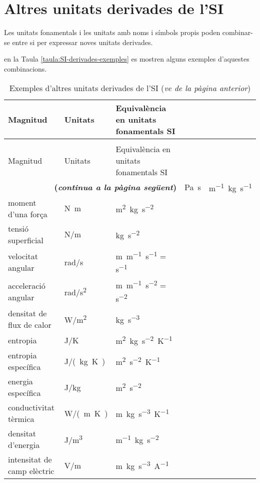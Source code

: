 \section{Altres unitats derivades de l'SI}

Les unitats fonamentals i les unitats amb noms i símbols propis poden combinar-se entre si per expressar noves unitats derivades.

 en la Taula \vref{taula:SI-derivades-exemples} es mostren alguns exemples d'aquestes combinacions.

\begin{longtable}[h]{lll}
   \caption{\label{taula:SI-derivades-exemples} Exemples d'altres unitats derivades de
   l'SI}\\
   \toprule[1pt]
    Magnitud &  Unitats & Equivalència en unitats fonamentals SI\\
   \midrule
   \endfirsthead
   \caption[]{Exemples d'altres unitats derivades de l'SI (\emph{ve de la pàgina
   anterior})}\\
   \toprule[1pt]
    Magnitud &  Unitats & Equivalència en unitats fonamentals SI\\
   \midrule
   \endhead
   \midrule
   \multicolumn{3}{r}{\sffamily\bfseries\color{NavyBlue}(\emph{continua a la pàgina següent})}
   \endfoot
   \endlastfoot
   viscositat dinàmica &  \si{Pa.s}& \si{m^{-1}.kg.s^{-1}} \\
   moment d'una força & \si{N.m} & \si{m^2.kg.s^{-2}} \\
   tensió superficial &  \si{N/m} &   \si{kg.s^{-2}} \\
   velocitat angular & \si{rad/s} & \si{m.m^{-1}.s^{-1}} = \si{s^{-1}} \\
   acceleració angular & \si{rad/s^2} & \si{m.m^{-1}.s^{-2}} = \si{s^{-2}} \\
   densitat de flux de calor & \si{W/m^2} & \si{kg.s^{-3}} \\
   entropia & \si{J/K} & \si{m^2.kg.s^{-2}.K^{-1}} \\
   entropia específica & \si{J/(kg.K)} &\si{m^2.s^{-2}.K^{-1}} \\
   energia específica & \si{J/kg} & \si{m^2.s^{-2}} \\
   conductivitat tèrmica & \si{W/(m.K)} & \si{m.kg.s^{-3}.K^{-1}} \\
   densitat d'energia & \si{J/m^3} & \si{m^{-1}.kg.s^{-2}} \\
   intensitat de camp elèctric & \si{V/m}& \si{m.kg.s^{-3}.A^{-1}}  \\

\end{longtable}
